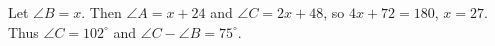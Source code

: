 Let $\angle B=x$. Then $\angle A=x+24$ and $\angle C=2x+48$, so $4x+72=180$, $x=27$. Thus $\angle C=102^\circ$ and $\angle C-\angle B=\boxed{75^\circ}$.
